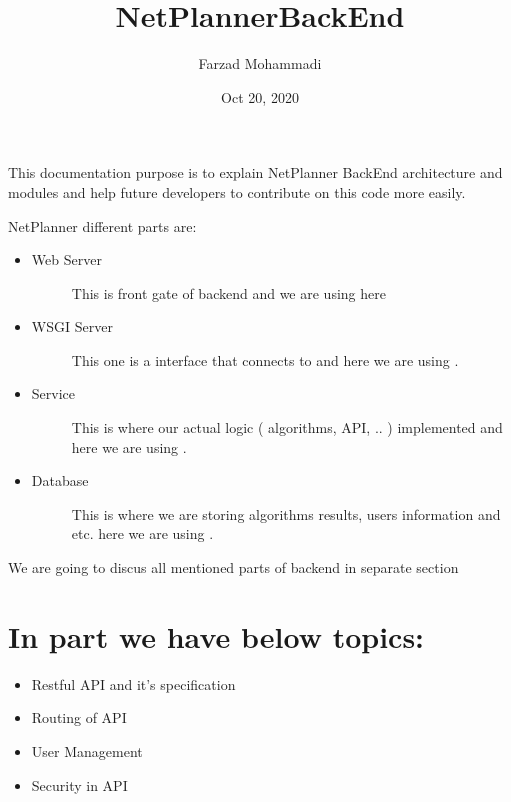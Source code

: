 \documentclass[letterpaper,10pt,english]{sphinxmanual}
\title{NetPlanner\sphinxhyphen{}BackEnd}
\date{Oct 20, 2020}
\author{Farzad Mohammadi}
\begin{document}
\pagestyle{empty}
\sphinxmaketitle
\pagestyle{plain}
\sphinxtableofcontents
\pagestyle{normal}
\label{\detokenize{index::doc}}


This documentation purpose is to explain NetPlanner BackEnd architecture and modules
and help future developers to contribute on this code more easily.

NetPlanner different parts are:
\begin{itemize}
\item {} \begin{description}
\item[{Web Server}] \leavevmode
This is front gate of backend and we are using  here

\end{description}

\item {} \begin{description}
\item[{WSGI Server}] \leavevmode
This one is a interface that connects  to 
and here we are using .

\end{description}

\item {} \begin{description}
\item[{Service}] \leavevmode
This is where our actual logic ( algorithms, API, .. ) implemented
and here we are using .

\end{description}

\item {} \begin{description}
\item[{Database}] \leavevmode
This is where we are storing algorithms results, users information and etc.
here we are using .

\end{description}

\end{itemize}

We are going to discus all mentioned parts of backend in separate section


\chapter{In  part we have below topics:}
\label{\detokenize{index:in-service-part-we-have-below-topics}}\begin{itemize}
\item {} 
Restful API and it’s specification

\item {} 
Routing of API

\item {} 
User Management

\item {} 
Security in API

\end{itemize}
\end{document}
